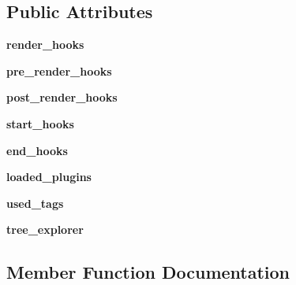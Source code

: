 \subsection*{Public Attributes}
\begin{DoxyCompactItemize}
\item 
\hypertarget{classtexla_1_1Renderers_1_1Renderer_1_1Renderer_a67f648f712e75417371647e0c80cc4d6}{}\label{classtexla_1_1Renderers_1_1Renderer_1_1Renderer_a67f648f712e75417371647e0c80cc4d6} 
{\bfseries render\+\_\+hooks}
\item 
\hypertarget{classtexla_1_1Renderers_1_1Renderer_1_1Renderer_a9817075b382f7fa1e523d45ceda34120}{}\label{classtexla_1_1Renderers_1_1Renderer_1_1Renderer_a9817075b382f7fa1e523d45ceda34120} 
{\bfseries pre\+\_\+render\+\_\+hooks}
\item 
\hypertarget{classtexla_1_1Renderers_1_1Renderer_1_1Renderer_a41343907b1bd157e20b8a59e02952589}{}\label{classtexla_1_1Renderers_1_1Renderer_1_1Renderer_a41343907b1bd157e20b8a59e02952589} 
{\bfseries post\+\_\+render\+\_\+hooks}
\item 
\hypertarget{classtexla_1_1Renderers_1_1Renderer_1_1Renderer_afab236e28ee034c4fa98de6aa0cea432}{}\label{classtexla_1_1Renderers_1_1Renderer_1_1Renderer_afab236e28ee034c4fa98de6aa0cea432} 
{\bfseries start\+\_\+hooks}
\item 
\hypertarget{classtexla_1_1Renderers_1_1Renderer_1_1Renderer_add33cdbfb21b10e4cb7c4cc0591a590e}{}\label{classtexla_1_1Renderers_1_1Renderer_1_1Renderer_add33cdbfb21b10e4cb7c4cc0591a590e} 
{\bfseries end\+\_\+hooks}
\item 
\hypertarget{classtexla_1_1Renderers_1_1Renderer_1_1Renderer_aae7192fca7376ffb380c73155721ab68}{}\label{classtexla_1_1Renderers_1_1Renderer_1_1Renderer_aae7192fca7376ffb380c73155721ab68} 
{\bfseries loaded\+\_\+plugins}
\item 
\hypertarget{classtexla_1_1Renderers_1_1Renderer_1_1Renderer_a1cb0d0cfd8fcb07a31b0b3f69570e679}{}\label{classtexla_1_1Renderers_1_1Renderer_1_1Renderer_a1cb0d0cfd8fcb07a31b0b3f69570e679} 
{\bfseries used\+\_\+tags}
\item 
\hypertarget{classtexla_1_1Renderers_1_1Renderer_1_1Renderer_a045926ded0210c33c770f1d5aec3421d}{}\label{classtexla_1_1Renderers_1_1Renderer_1_1Renderer_a045926ded0210c33c770f1d5aec3421d} 
{\bfseries tree\+\_\+explorer}
\end{DoxyCompactItemize}


\subsection{Member Function Documentation}
\hypertarget{classtexla_1_1Renderers_1_1Renderer_1_1Renderer_aa5ac1cc3c4e118189bd4497ed03564dd}{}\label{classtexla_1_1Renderers_1_1Renderer_1_1Renderer_aa5ac1cc3c4e118189bd4497ed03564dd} 
